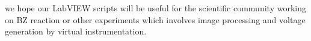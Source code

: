 \documentclass[journal=jacsat,manuscript=article]{achemso}
\begin{document}
we hope our LabVIEW scripts will be useful for the scientific community working on BZ reaction or other experiments  which involves image processing and voltage generation by virtual instrumentation.
\begin{acknowledgement}
\end{acknowledgement}

\begin{suppinfo}
\end{suppinfo}


\end{document}

